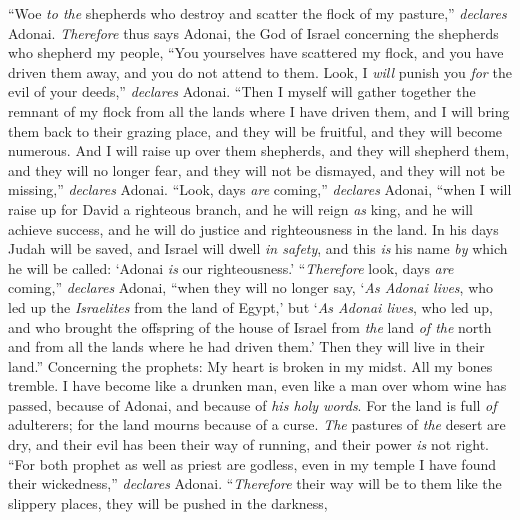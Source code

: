 \begin{biblechapter} %
 “Woe \textit{to the} shepherds who destroy and scatter the flock of my pasture,” \textit{declares} Adonai.
\verse \textit{Therefore} thus says Adonai, the God of Israel concerning the shepherds who shepherd my people, “You yourselves have scattered my flock, and you have driven them away, and you do not attend to them. Look, I \textit{will} punish you \textit{for} the evil of your deeds,” \textit{declares} Adonai.
\verse “Then I myself will gather together the remnant of my flock from all the lands where I have driven them, and I will bring them back to their grazing place, and they will be fruitful, and they will become numerous.
\verse And I will raise up over them shepherds, and they will shepherd them, and they will no longer fear, and they will not be dismayed, and they will not be missing,” \textit{declares} Adonai.
 “Look, days \textit{are} coming,” \textit{declares} Adonai, 
“when I will raise up for David a righteous branch, 
and he will reign \textit{as} king, and he will achieve success, 
and he will do justice and righteousness in the land.
\verse In his days Judah will be saved, 
and Israel will dwell \textit{in safety}, 
and this \textit{is} his name \textit{by} which he will be called: 
‘Adonai \textit{is} our righteousness.’
\verse “\textit{Therefore} look, days \textit{are} coming,” \textit{declares} Adonai, “when they will no longer say, ‘\textit{As Adonai lives}, who led up the \textit{Israelites} from the land of Egypt,’
\verse but ‘\textit{As Adonai lives}, who led up, and who brought the offspring of the house of Israel from \textit{the} land \textit{of the} north and from all the lands where he had driven them.’ Then they will live in their land.”
 Concerning the prophets:
\verse My heart is broken in my midst. 
All my bones tremble. 
I have become like a drunken man, 
even like a man over whom wine has passed, 
because of Adonai, 
and because of \textit{his holy words}.
\verse For the land is full \textit{of} adulterers; 
for the land mourns because of a curse. 
\textit{The} pastures of \textit{the} desert are dry, 
and their evil has been their way of running, 
and their power \textit{is} not right.
\verse “For both prophet as well as priest are godless, 
even in my temple I have found their wickedness,” \textit{declares} Adonai.
\verse “\textit{Therefore} their way will be to them like the slippery places, 
they will be pushed in the darkness, 

\end{biblechapter}
